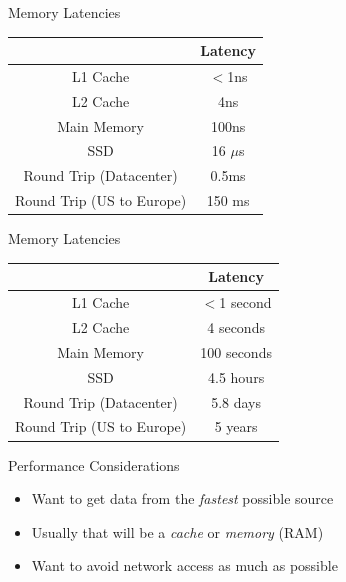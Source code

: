 \documentclass[12pt, aspectration=169]{beamer}
\begin{document}
    \begin{frame}{Memory Latencies}
        \begin{center}
            \begin{tabular}{|c c|}
             \hline
              & Latency \\ [0.5ex]
             \hline\hline
             L1 Cache & $<$1ns \\
             \hline
             L2 Cache & 4ns \\
             \hline
             Main Memory & 100ns \\
             \hline
             SSD & 16 $\mu$s \\ [1ex]
             \hline
             Round Trip (Datacenter)   & 0.5ms     \\
             \hline
             Round Trip (US to Europe) & 150 ms \\ [1ex]
             \hline
            \end{tabular}
        \end{center}
    \end{frame}

    \begin{frame}{Memory Latencies}
        \begin{center}
            \begin{tabular}{|c c|}
             \hline
              & Latency \\ [0.5ex]
             \hline\hline
             L1 Cache & $<$1 second \\
             \hline
             L2 Cache & 4 seconds \\
             \hline
             Main Memory & 100 seconds \\
             \hline
             SSD & 4.5 hours \\ [1ex]
             \hline
             Round Trip (Datacenter)   & 5.8 days     \\
             \hline
             Round Trip (US to Europe) & 5 years \\ [1ex]
             \hline
            \end{tabular}
        \end{center}
    \end{frame}

    \begin{frame}{Performance Considerations}
        \begin{itemize}
            \item Want to get data from the \textit{fastest} possible source
            \item Usually that will be a \textit{cache} or \textit{memory} (RAM)
            \item Want to avoid network access as much as possible
        \end{itemize}
    \end{frame}
\end{document}
